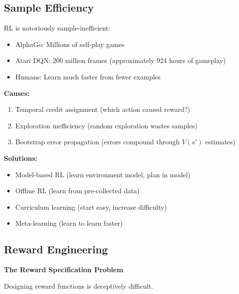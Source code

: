 \subsection{Sample Efficiency}

\begin{remark}
RL is notoriously sample-inefficient:

\begin{itemize}
    \item AlphaGo: Millions of self-play games
    \item Atari DQN: 200 million frames (approximately 924 hours of gameplay)
    \item Humans: Learn much faster from fewer examples
\end{itemize}

\textbf{Causes:}
\begin{enumerate}
    \item Temporal credit assignment (which action caused reward?)
    \item Exploration inefficiency (random exploration wastes samples)
    \item Bootstrap error propagation (errors compound through $V(s')$ estimates)
\end{enumerate}

\textbf{Solutions:}
\begin{itemize}
    \item Model-based RL (learn environment model, plan in model)
    \item Offline RL (learn from pre-collected data)
    \item Curriculum learning (start easy, increase difficulty)
    \item Meta-learning (learn to learn faster)
\end{itemize}
\end{remark}

\subsection{Reward Engineering}

\begin{philosophical}
\textbf{The Reward Specification Problem}

Designing reward functions is deceptively difficult.
\end{philosophical}
